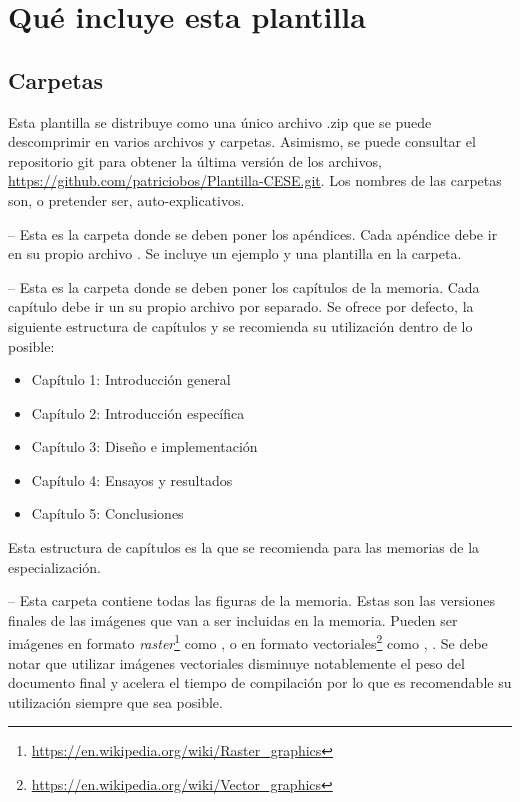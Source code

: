 
\section{Qué incluye esta plantilla}

\subsection{Carpetas}

Esta plantilla se distribuye como una único archivo .zip que se puede descomprimir en varios archivos y carpetas. Asimismo, se puede consultar el repositorio git para obtener la última versión de los archivos, \url{https://github.com/patriciobos/Plantilla-CESE.git}. Los nombres de las carpetas son, o pretender ser, auto-explicativos.

 -- Esta es la carpeta donde se deben poner los apéndices. Cada apéndice debe ir en su propio archivo . Se incluye un ejemplo y una plantilla en la carpeta.

 -- Esta es la carpeta donde se deben poner los capítulos de la memoria. Cada capítulo debe ir un su propio archivo  por separado.  Se ofrece por defecto, la siguiente estructura de capítulos y se recomienda su utilización dentro de lo posible:

\begin{itemize}
\item Capítulo 1: Introducción general	
\item Capítulo 2: Introducción específica
\item Capítulo 3: Diseño e implementación
\item Capítulo 4: Ensayos y resultados
\item Capítulo 5: Conclusiones

\end{itemize}

Esta estructura de capítulos es la que se recomienda para las memorias de la especialización.

 -- Esta carpeta contiene todas las figuras de la memoria.  Estas son las versiones finales de las imágenes que van a ser incluidas en la memoria.  Pueden ser imágenes en formato \textit{raster}\footnote{\url{https://en.wikipedia.org/wiki/Raster_graphics}} como ,  o en formato vectoriales\footnote{\url{https://en.wikipedia.org/wiki/Vector_graphics}} como , .  Se debe notar que utilizar imágenes vectoriales disminuye notablemente el peso del documento final y acelera el tiempo de compilación por lo que es recomendable su utilización siempre que sea posible.

